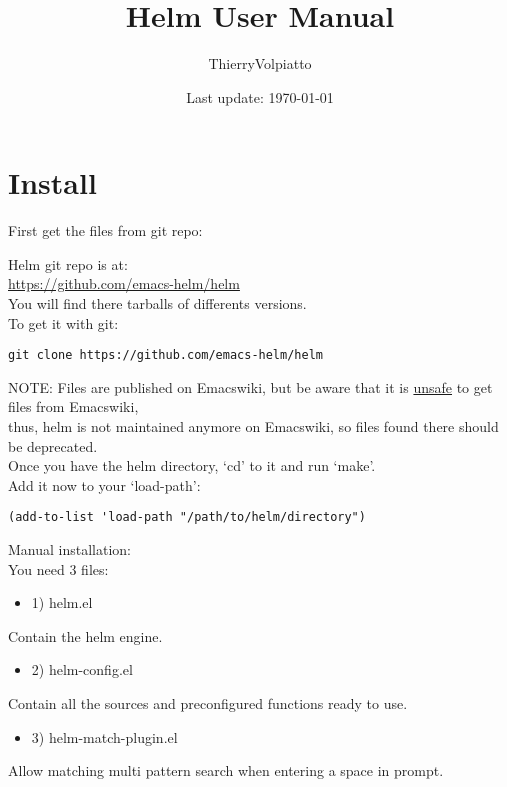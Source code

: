 \documentclass[a4paper,11pt]{article}
\begin{document}
\begin{titlepage}
\title{Helm User Manual}
\date{Last update: \today}
\author{ThierryVolpiatto}
\maketitle
\tableofcontents
\end{titlepage}

\section{Install}
\label{sec:install}

First get the files from git repo:

Helm git repo is at:\\
\url{https://github.com/emacs-helm/helm}\\
You will find there tarballs of differents versions.\\

To get it with git:
\begin{verbatim}
git clone https://github.com/emacs-helm/helm
\end{verbatim}
NOTE: Files are published on Emacswiki, but be aware that it is \underline{unsafe} to get files from Emacswiki,\\
thus, helm is not maintained anymore on Emacswiki, so files found there should be deprecated.\\

Once you have the helm directory, `cd' to it and run `make'.\\
Add it now to your `load-path':
\begin{verbatim}
(add-to-list 'load-path "/path/to/helm/directory")
\end{verbatim}


Manual installation:\\
          
You need 3 files:
\begin{itemize}
\item 1) helm.el
\end{itemize}
Contain the helm engine.

\begin{itemize}
\item 2) helm-config.el
\end{itemize}
Contain all the sources and preconfigured functions ready to use.

\begin{itemize}
\item 3) helm-match-plugin.el
\end{itemize}
Allow matching multi pattern search when entering a space in prompt.
\end{document}
